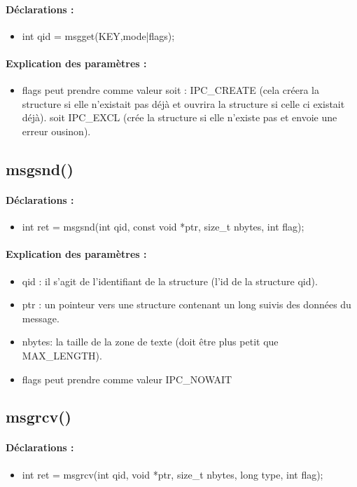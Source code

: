 \documentclass{article}[12pt]
\begin{document}
\paragraph{Déclarations : }
\begin{itemize}
	\item int qid = msgget(KEY,mode|flags);
\end{itemize}
\paragraph{Explication des paramètres : }
\begin{itemize}
	\item flags peut prendre comme valeur soit : IPC\_CREATE (cela créera la structure si elle n'existait pas déjà et ouvrira la structure si celle ci existait déjà). soit IPC\_EXCL (crée la structure si elle n'existe pas et envoie une erreur ousinon).   
\end{itemize}
\subsection{msgsnd()}
\paragraph{Déclarations : }
\begin{itemize}
	\item int ret = msgsnd(int qid, const void *ptr, size\_t nbytes, int flag); 
\end{itemize}
\paragraph{Explication des paramètres : }
\begin{itemize}
\item qid : il s'agit de l'identifiant de la structure (l'id de la structure qid). 
\item ptr : un pointeur vers une structure contenant un long suivis des données du message.
\item nbytes: la taille de la zone de texte (doit être plus petit que MAX\_LENGTH).
\item flags peut prendre comme valeur IPC\_NOWAIT  
\end{itemize}
\subsection{msgrcv()}
\paragraph{Déclarations : }
\begin{itemize}
	\item int ret = msgrcv(int qid, void *ptr, size\_t nbytes, long type, int flag); 
\end{itemize}
\end{document}

